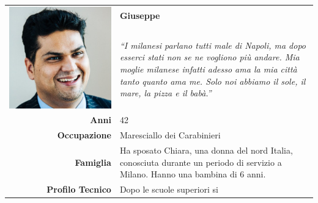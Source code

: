 \begin{table}[H]
	\begin{centering}
	\begin{tabular} { | r  p{12cm} | }
		\hline
		\multirow{2}{*}{
			\begin{minipage}{.15 \textheight}
				\vspace{0.1in}
				\includegraphics[width=\linewidth]{img/personas/giuseppe.png}
			\end{minipage}
		}
	 	& \vspace{0.1 in}\Large\textbf{Giuseppe} \\ 
		& \vspace{0.1 in}\large{\emph{``I milanesi parlano tutti male di
Napoli, ma dopo esserci stati non se ne vogliono più andare. Mia moglie
milanese infatti adesso ama la mia città tanto quanto ama me. Solo noi abbiamo il
sole, il mare, la pizza e il babà.''}}\\[8ex]
		\hline
		\textbf{Anni} & 42 \\ \hline
		\textbf{Occupazione} & Maresciallo dei Carabinieri \\ \hline
		\textbf{Famiglia} & Ha sposato Chiara, una donna del nord
Italia, conosciuta durante un periodo di servizio a Milano. Hanno una
bambina di 6 anni.\\ \hline
		\textbf{Profilo Tecnico} & Dopo le scuole superiori si

\end{tabular}
\end{centering}
\end{table}
